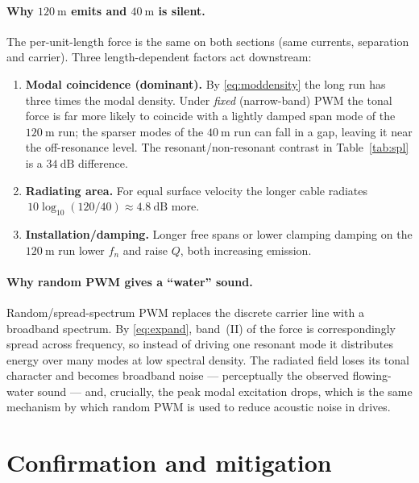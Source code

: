 \documentclass[11pt,a4paper,oneside]{book}
\begin{document}
\begin{onehalfspace}
\begin{appendices}
\paragraph{Why $120\ \mathrm{m}$ emits and $40\ \mathrm{m}$ is silent.}
The per-unit-length force is the same on both sections (same currents, separation
and carrier). Three length-dependent factors act downstream:
\begin{enumerate}[leftmargin=*,nosep]
	\item \textbf{Modal coincidence (dominant).} By \eqref{eq:moddensity} the long run
	has three times the modal density. Under \emph{fixed} (narrow-band) PWM the tonal
	force is far more likely to coincide with a lightly damped span mode of the
	$120\ \mathrm{m}$ run; the sparser modes of the $40\ \mathrm{m}$ run can fall in a
	gap, leaving it near the off-resonance level. The resonant/non-resonant contrast
	in Table~\ref{tab:spl} is a $34\ \mathrm{dB}$ difference.
	\item \textbf{Radiating area.} For equal surface velocity the longer cable radiates
	$\,10\log_{10}(120/40)\approx4.8\ \mathrm{dB}$ more.
	\item \textbf{Installation/damping.} Longer free spans or lower clamping damping on
	the $120\ \mathrm{m}$ run lower $f_n$ and raise $Q$, both increasing emission.
\end{enumerate}

\paragraph{Why random PWM gives a ``water'' sound.}
Random/spread-spectrum PWM replaces the discrete carrier line with a broadband
spectrum. By \eqref{eq:expand}, band~(II) of the force is correspondingly spread
across frequency, so instead of driving one resonant mode it distributes energy
over many modes at low spectral density. The radiated field loses its tonal
character and becomes broadband noise --- perceptually the observed flowing-water
sound --- and, crucially, the peak modal excitation drops, which is the same
mechanism by which random PWM is used to reduce acoustic noise in drives.

\section{Confirmation and mitigation}

\end{appendices}
\end{onehalfspace}
\end{document}
